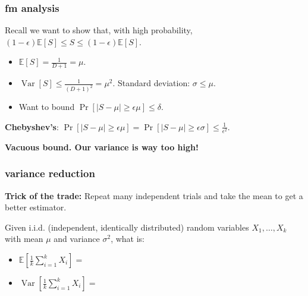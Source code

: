 \documentclass[compress]{beamer}
\newcommand{\E}{\mathbb{E}}
\DeclareMathOperator{\Var}{Var}
\begin{document}
\begin{frame}
	\frametitle{fm analysis}
	Recall we want to show that, with high probability, $(1-\epsilon) \E[S] \leq S \leq (1-\epsilon) \E[S]$. \vspace{1em}
	\begin{itemize}
		\item $\E[S] = \frac{1}{D+1} = \mu.$ \vspace{.5em}
		\item $\Var[S] \leq \frac{1}{(D+1)^2} = \mu^2$. Standard deviation: $\sigma \leq \mu$. \vspace{.5em}
		\item Want to bound $\Pr[|S - \mu| \geq \epsilon \mu] \leq \delta$. \vspace{.5em}
	\end{itemize}
	
	\textbf{Chebyshev's}: $\Pr[|S - \mu| \geq \epsilon \mu] = \Pr[|S - \mu| \geq \epsilon \sigma] \leq \frac{1}{\epsilon^2}$.
	
	\begin{center}
	\alert{\textbf{Vacuous bound. Our variance is way too high!}}
	\end{center}
\end{frame}


\begin{frame}
	\frametitle{variance reduction}
	\textbf{Trick of the trade:} Repeat many independent trials and take the mean to get a better estimator.
	
	Given i.i.d. (independent, identically distributed) random variables $X_1, \ldots, X_k$ with mean $\mu$ and variance $\sigma^2$, what is:
	\begin{itemize}
		\item $\E\left[\frac{1}{k}\sum_{i=1}^k X_i\right] = $
		\vspace{1em}
		\item $\Var\left[\frac{1}{k}\sum_{i=1}^k X_i\right] = $
	\end{itemize} 
\end{frame}
\end{document}
